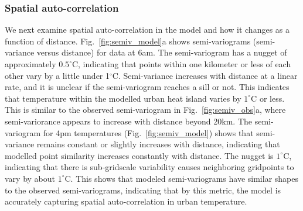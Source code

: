 \documentclass[draft,linenumbers]{agujournal}
\begin{document}
\subsubsection{Spatial auto-correlation}
We next examine spatial auto-correlation in the model and how it changes as a function of distance. Fig.~\ref{fig:semiv_model}a shows semi-variograms (semi-variance versus distance) for data at 6am. The semi-variogram has a nugget of approximately $0.5^\circ$C, indicating that points within one kilometer or less of each other vary by a little under 1$^\circ$C. Semi-variance increases with distance at a linear rate, and it is unclear if the semi-variogram reaches a sill or not. This indicates that temperature within the modelled urban heat island varies by $1^\circ$C or less. This is similar to the observed semi-variogram in Fig.~\ref{fig:semiv_obs}a, where semi-variorance appears to increase with distance beyond 20km. The semi-variogram for 4pm temperatures (Fig.~\ref{fig:semiv_model}) shows that semi-variance remains constant or slightly increases with distance, indicating that modelled point similarity increases constantly with distance. The nugget is $1^\circ$C, indicating that there is sub-gridscale variability causes neighboring gridpoints to vary by about $1^\circ$C. 
This shows that modeled semi-variograms have similar shapes to the observed semi-variograms, indicating that by this metric, the model is accurately capturing spatial auto-correlation in urban temperature. %
\end{document}
